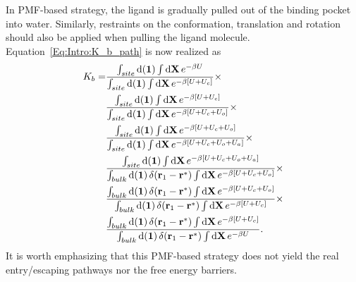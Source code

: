 In PMF-based strategy, the ligand is gradually pulled out of the binding pocket into water. Similarly, restraints on the conformation, translation and rotation should also be applied when pulling the ligand molecule. Equation~\ref{Eq:Intro:K_b_path} is now realized as
\begin{align}
K_b=&\frac{\int_{site}\diff(\mathbf{1})\int \diff\mathbf{X}\,e^{-\beta U}}{\int_{site}\diff(\mathbf{1})\int \diff\mathbf{X}\,e^{-\beta [U+U_c]}}\times\notag\\
    &\frac{\int_{site}\diff(\mathbf{1})\int \diff\mathbf{X}\,e^{-\beta [U+U_c]}}{\int_{site}\diff(\mathbf{1})\int \diff\mathbf{X}\,e^{-\beta [U+U_c+U_o]}}\times\notag\\
    &\frac{\int_{site}\diff(\mathbf{1})\int \diff\mathbf{X}\,e^{-\beta [U+U_c+U_o]}}{\int_{site}\diff(\mathbf{1})\int \diff\mathbf{X}\,e^{-\beta [U+U_c+U_o+U_a]}}\times\notag\\
    &\frac{\int_{site}\diff(\mathbf{1})\int \diff\mathbf{X}\,e^{-\beta [U+U_c+U_o+U_a]}}{\int_{bulk}\diff(\mathbf{1})\,\delta(\mathbf{r}_1-\mathbf{r}^*)\int \diff\mathbf{X}\,e^{-\beta [U+U_c+U_o]}}\times\notag\\
    &\frac{\int_{bulk}\diff(\mathbf{1})\,\delta(\mathbf{r}_1-\mathbf{r}^*)\int \diff\mathbf{X}\,e^{-\beta [U+U_c+U_o]}}{\int_{bulk}\diff(\mathbf{1})\,\delta(\mathbf{r}_1-\mathbf{r}^*)\int \diff\mathbf{X}\,e^{-\beta [U+U_c]}}\times\notag\\
    &\frac{\int_{bulk}\diff(\mathbf{1})\,\delta(\mathbf{r}_1-\mathbf{r}^*)\int \diff\mathbf{X}\,e^{-\beta [U+U_c]}}{\int_{bulk}\diff(\mathbf{1})\,\delta(\mathbf{r}_1-\mathbf{r}^*)\int \diff\mathbf{X}\,e^{-\beta U}}.
\end{align}
It is worth emphasizing that this PMF-based strategy does not yield the real entry/escaping pathways nor the free energy barriers.